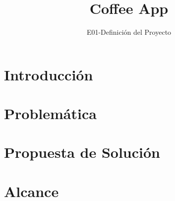 \documentclass[11pt,twoside]{book}
\title{Coffee App}
\subtitle{E01-Definición del Proyecto}
\date{}
\begin{document}
	\maketitle
	\tableofcontents
	\listoffigures
	
	\newpage
	\projectCharter
	\firmas
	
	\chapter{Introducción}
	
	
	\chapter{Problemática}
	\label{ch:bc}
	
	
	
	\chapter{Propuesta de Solución}
	\label{ch:ps} 
	
	
	\chapter{Alcance}
	\label{ch:al}
	
	
	\newpage
	\clossing
	
\end{document}
